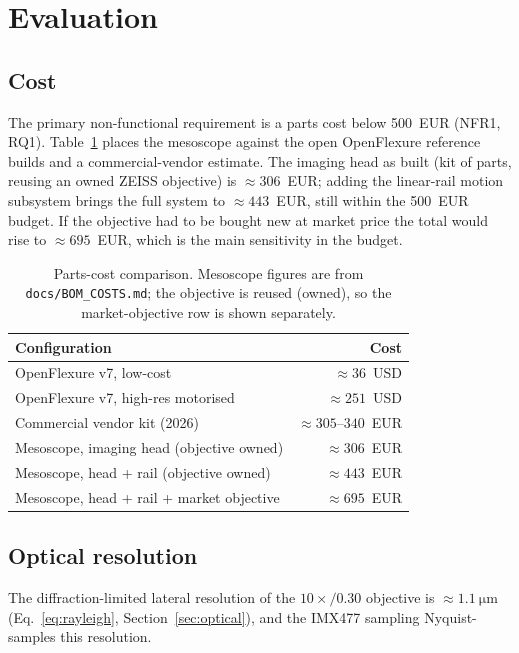 \section{Evaluation}
\label{sec:evaluation}

\subsection{Cost}
The primary non-functional requirement is a parts cost below \num{500}~EUR
(NFR1, RQ1). Table~\ref{tab:cost} places the mesoscope against the open
OpenFlexure reference builds and a commercial-vendor estimate. The imaging head
as built (kit of parts, reusing an owned ZEISS objective) is
$\approx\num{306}$~EUR; adding the linear-rail motion subsystem brings the full
system to $\approx\num{443}$~EUR, still within the \num{500}~EUR budget. If the
objective had to be bought new at market price the total would rise to
$\approx\num{695}$~EUR, which is the main sensitivity in the budget.

\begin{table}[!t]
  \centering
  \caption{Parts-cost comparison. Mesoscope figures are from
  \texttt{docs/BOM\_COSTS.md}; the objective is reused (owned), so the
  market-objective row is shown separately.}
  \label{tab:cost}
  \begin{tabular}{@{}lr@{}}
    \toprule
    Configuration & Cost \\
    \midrule
    OpenFlexure v7, low-cost        & $\approx\num{36}$~USD \\
    OpenFlexure v7, high-res motorised & $\approx\num{251}$~USD \\
    Commercial vendor kit (2026)    & $\approx\num{305}$--$\num{340}$~EUR \\
    \midrule
    Mesoscope, imaging head (objective owned) & $\approx\num{306}$~EUR \\
    Mesoscope, head + rail (objective owned)  & $\approx\num{443}$~EUR \\
    Mesoscope, head + rail + market objective & $\approx\num{695}$~EUR \\
    \bottomrule
  \end{tabular}
\end{table}

\subsection{Optical resolution}
The diffraction-limited lateral resolution of the $10\times/0.30$ objective is
$\approx\SI{1.1}{\micro\meter}$ (Eq.~\ref{eq:rayleigh},
Section~\ref{sec:optical}), and the IMX477 sampling Nyquist-samples this
resolution. 


